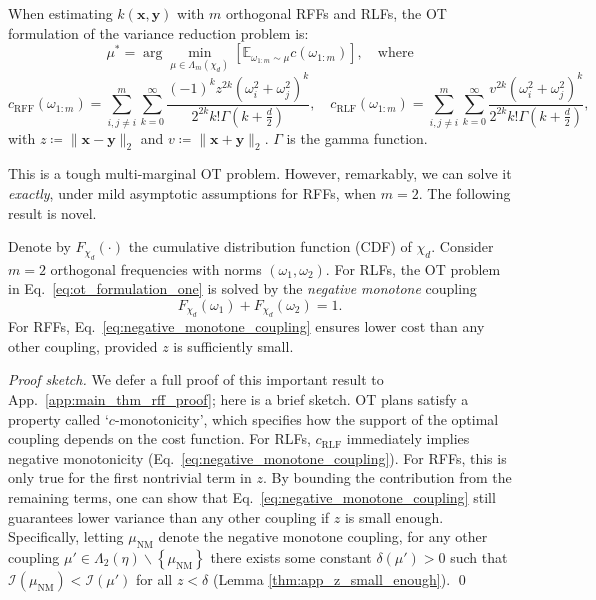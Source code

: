 \begin{lemma} \label{lemma:ot_rff_formulation}
    When estimating $k(\boldsymbol{x},\boldsymbol{y})$ with $m$ orthogonal RFFs and RLFs, the OT formulation of the variance reduction problem is: 
    \begin{equation} \label{eq:ot_formulation_one}
    \mu^* = \arg \min_{\mu \in \Lambda_m(\chi_d)} \left [ \mathbb{E}_{\omega_{1:m} \sim \mu}  c(\omega_{1:m}) \right], \quad \textrm{where}
\end{equation} \vspace{-1mm}
\begin{equation} \label{eq:cost_functions}
    c_\textrm{RFF}(\omega_{1:m}) = \sum_{i, j \neq i}^m \sum_{k=0}^\infty \frac{(-1)^k z^{2k} \left( \omega_i^2 + \omega_j^2 \right)^k}{2^{2k} k! \Gamma(k+\frac{d}{2})},  \quad c_\textrm{RLF}(\omega_{1:m}) = \sum_{i, j \neq i}^m \sum_{k=0}^\infty \frac{v^{2k} (\omega_i^2 + \omega_j^2) ^{k}}{2^{2k} k! \Gamma(k+\frac{d}{2})}, 
\end{equation}
with $z \coloneqq \|\boldsymbol{x} - \boldsymbol{y}\|_2$ and $v \coloneqq \|\boldsymbol{x} + \boldsymbol{y}\|_2$.
$\Gamma$ is the gamma function.
\end{lemma}
This is a tough multi-marginal OT problem. 
However, remarkably, we can solve it \emph{exactly}, under mild asymptotic assumptions for RFFs, when $m = 2$.
The following result is novel.

\begin{theorem}[Solution to OT problem when $m=2$]\label{thm:pairwise_ot_solution}
Denote by $F_{\chi_d}(\cdot)$ the cumulative distribution function (CDF) of $\chi_d$. 
Consider $m=2$ orthogonal frequencies with norms $(\omega_1, \omega_2)$.
For RLFs, the OT problem in Eq.~\ref{eq:ot_formulation_one} is solved by the \emph{negative monotone} coupling
\begin{equation} \label{eq:negative_monotone_coupling}
    F_{\chi_d}(\omega_1) + F_{\chi_d}(\omega_2) = 1.
\end{equation}
For RFFs, Eq.~\ref{eq:negative_monotone_coupling} ensures lower cost than any other coupling, provided $z$ is sufficiently small.
\end{theorem}
\emph{Proof sketch.} We defer a full proof of this important result to App.~\ref{app:main_thm_rff_proof}; here is a brief sketch. %
OT plans satisfy a property called `$c$-monotonicity', which specifies how the support of the optimal coupling depends on the cost function. 
For RLFs, $c_\textrm{RLF}$ immediately implies negative monotonicity (Eq.~\ref{eq:negative_monotone_coupling}).
For RFFs, this is only true for the first nontrivial term in $z$. 
By bounding the contribution from the remaining terms, one can show that Eq.~\ref{eq:negative_monotone_coupling} still guarantees lower variance than any other coupling if $z$ is small enough.
Specifically, letting $\mu_\textrm{NM}$ denote the negative monotone coupling, for any other coupling $\mu' \in \Lambda_2(\eta) \backslash \left \{ \mu_\textrm{NM} \right \}$ there exists some constant $\delta(\mu')>0$ such that $\mathcal{I}(\mu_\textrm{NM}) < \mathcal{I}(\mu')$ for all $z < \delta$ (Lemma \ref{thm:app_z_small_enough}). \qed



